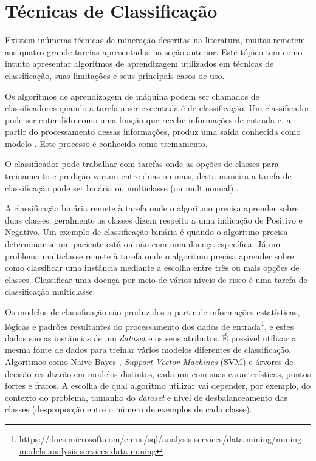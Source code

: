 \section{Técnicas de Classificação}
Existem inúmeras técnicas de mineração descritas na literatura, muitas remetem aos quatro grande tarefas apresentados na seção anterior. Este tópico tem como intuito apresentar algoritmos de aprendizagem utilizados em técnicas de classificação, suas limitações e seus principais casos de uso.

Os algoritmos de aprendizagem de máquina podem ser chamados de classificadores quando a tarefa a ser executada é de classificação. Um classificador pode ser entendido como uma função que recebe informações de entrada e, a partir do processamento dessas informações, produz uma saída conhecida como modelo \cite{Fayyad1996}. Este processo é conhecido como treinamento.

O classificador pode trabalhar com tarefas onde as opções de classes para treinamento e predição variam entre duas ou mais, desta maneira a tarefa de classificação pode ser binária ou multiclasse (ou multinomial) \cite{Aggarwal2015}.

A classificação binária remete à tarefa onde o algoritmo precisa aprender sobre duas classes, geralmente as classes dizem respeito a uma indicação de Positivo e Negativo. Um exemplo de classificação binária é quando o algoritmo precisa determinar se um paciente está ou não com uma doença específica. Já um problema multiclasse remete à tarefa onde o algoritmo precisa aprender sobre como classificar uma instância mediante a escolha entre três ou mais opções de classes. Classificar uma doença por meio de vários níveis de risco é uma tarefa de classificação multiclasse.

Os modelos de classificação são produzidos a partir de informações estatísticas, lógicas e padrões resultantes do processamento dos dados de entrada\footnote{\url{https://docs.microsoft.com/en-us/sql/analysis-services/data-mining/mining-models-analysis-services-data-mining}}, e estes dados são as instâncias de um \emph{dataset} e os seus atributos. É possível utilizar a mesma fonte de dados para treinar vários modelos diferentes de classificação. Algoritmos como Naive Bayes \cite{Mccallum1998}, \emph{Support Vector Machines} (SVM) \cite{Meyer2017} e árvores de decisão \cite{Schmid2013} resultarão em modelos distintos, cada um com suas características, pontos fortes e fracos. A escolha de qual algoritmo utilizar vai depender, por exemplo, do contexto do problema, tamanho do \emph{dataset} e nível de desbalanceamento das classes (desproporção entre o número de exemplos de cada classe).

